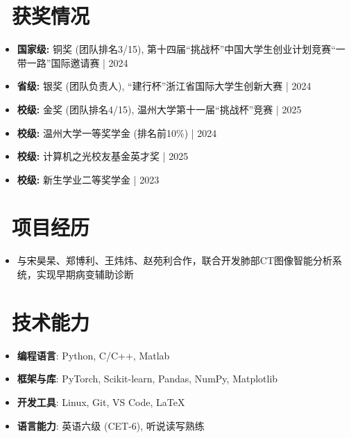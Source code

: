 \documentclass{resume}
\begin{document}
\section{\faTrophy\ 获奖情况}
\begin{itemize}[parsep=0.5ex]
  \item \textbf{国家级:} 铜奖 (团队排名3/15), 第十四届“挑战杯”中国大学生创业计划竞赛“一带一路”国际邀请赛 | 2024
  \item \textbf{省级:} 银奖 (团队负责人), “建行杯”浙江省国际大学生创新大赛 | 2024
  \item \textbf{校级:} 金奖 (团队排名4/15), 温州大学第十一届“挑战杯”竞赛 | 2025
  \item \textbf{校级:} 温州大学一等奖学金 (排名前10\%) | 2024
  \item \textbf{校级:} 计算机之光校友基金英才奖 | 2025
  \item \textbf{校级:} 新生学业二等奖学金 | 2023
\end{itemize}

\section{\faUsers\ 项目经历}
\begin{itemize}
  \item 与宋昊杲、郑博利、王炜炜、赵苑利合作，联合开发肺部CT图像智能分析系统，实现早期病变辅助诊断
\end{itemize}

\section{\faCogs\ 技术能力}
\begin{itemize}[parsep=0.5ex]
  \item \textbf{编程语言}: Python, C/C++, Matlab
  \item \textbf{框架与库}: PyTorch, Scikit-learn, Pandas, NumPy, Matplotlib  
  \item \textbf{开发工具}: Linux, Git, VS Code, LaTeX
  \item \textbf{语言能力}: 英语六级 (CET-6), 听说读写熟练
\end{itemize}
\end{document}
